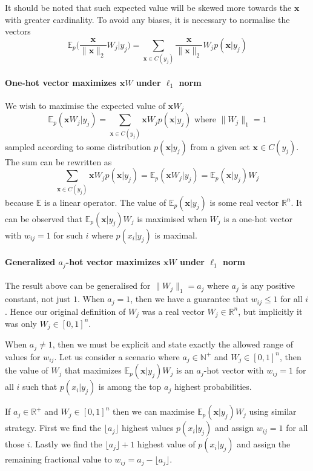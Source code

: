 \documentclass[12pt]{article}
\begin{document}
It should be noted that such expected value will be skewed more towards the $\boldsymbol{x}$ with greater cardinality. To avoid any biases, it is necessary to normalise the vectors 
\[
\mathbb{E}_{p}\big(\frac{\boldsymbol{x}}{\lVert \boldsymbol{x} \rVert_2}W_j|y_j \big)= \sum_{\boldsymbol{x}\in C(y_j)} \frac{\boldsymbol{x}}{\lVert \boldsymbol{x} \rVert_2} W_j p(\boldsymbol{x}|y_j)
\]


\paragraph{One-hot vector maximizes $\boldsymbol{x}W$ under $\ell_1$ norm}
We wish to maximise the expected value of $\boldsymbol{x}W_j$ 
\[
\mathbb{E}_{p}(\boldsymbol{x}W_j|y_j)=\sum_{\boldsymbol{x}\in C(y_j)} \boldsymbol{x} W_j p(\boldsymbol{x}|y_j) \text{ where } \lVert W_j \rVert_1=1
\]
sampled according to some distribution $p(\boldsymbol{x}|y_j)$ from a given set $\boldsymbol{x}\in C(y_j)$.  The sum can be rewritten as
\[
\sum_{\boldsymbol{x}\in C(y_j)} \boldsymbol{x} W_j p(\boldsymbol{x}|y_j) = \mathbb{E}_{p}(\boldsymbol{x} W_j|y_j) = \mathbb{E}_{p}(\boldsymbol{x}|y_j)W_j
\]
because $\mathbb{E}$ is a linear operator. The value of $\mathbb{E}_{p}(\boldsymbol{x}|y_j)$ is some real vector $\mathbb{R}^n$.  It can be observed that $\mathbb{E}_{p}(\boldsymbol{x}|y_j)W_j$ is maximised when $W_j$ is a one-hot vector with $w_{ij}=1$ for such $i$ where $p(x_i|y_j)$ is maximal. 

\paragraph{Generalized $a_j$-hot vector maximizes $\boldsymbol{x}W$ under $\ell_1$ norm}
The result above can be generalised for $\lVert W_j \rVert_1 = a_j$ where $a_j$ is any positive constant, not just $1$. When $a_j=1$, then we have a guarantee that $w_{ij}\le 1$ for all $i$. Hence our original definition of $W_j$ was a real vector $W_j\in \mathbb{R}^n$, but implicitly it was only $W_j\in [0,1]^n$. 

When $a_j\ne 1$, then we must be explicit and state exactly the allowed range of values for $w_{ij}$. Let us consider a scenario where $a_j\in\mathbb{N}^+$ and $W_j\in [0,1]^n$, then the value of $W_j$ that maximizes $\mathbb{E}_{p}(\boldsymbol{x}|y_j)W_j$ is an $a_j$-hot vector with $w_{ij}=1$ for all $i$ such that $p(x_i|y_j)$ is among the top $a_j$ highest probabilities. 

If $a_j\in\mathbb{R}^+$ and $W_j\in [0,1]^n$ then we can maximise $\mathbb{E}_{p}(\boldsymbol{x}|y_j)W_j$ using similar strategy. First we find the $\lfloor a_j \rfloor$ highest values $p(x_i|y_j)$ and assign $w_{ij}=1$ for all those $i$. Lastly we find the $\lfloor a_j \rfloor+1$ highest value of $p(x_i|y_j)$ and assign the remaining fractional value to $w_{ij}=a_j - \lfloor a_j \rfloor$. 
\end{document}
